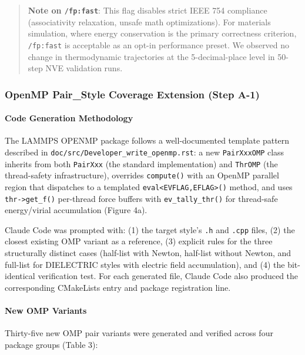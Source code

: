 \documentclass[
  11pt,
]{article}
\begin{document}
\begin{quote}
\textbf{Note on \texttt{/fp:fast}}: This flag disables strict IEEE 754
compliance (associativity relaxation, unsafe math optimizations). For
materials simulation, where energy conservation is the primary
correctness criterion, \texttt{/fp:fast} is acceptable as an opt-in
performance preset. We observed no change in thermodynamic trajectories
at the 5-decimal-place level in 50-step NVE validation runs.
\end{quote}

\subsubsection{OpenMP Pair\_Style Coverage Extension (Step
A-1)}\label{openmp-pair_style-coverage-extension-step-a-1}

\paragraph{Code Generation
Methodology}\label{code-generation-methodology}

The LAMMPS OPENMP package follows a well-documented template pattern
described in \texttt{doc/src/Developer\_write\_openmp.rst}: a new
\texttt{PairXxxOMP} class inherits from both \texttt{PairXxx} (the
standard implementation) and \texttt{ThrOMP} (the thread-safety
infrastructure), overrides \texttt{compute()} with an OpenMP parallel
region that dispatches to a templated
\texttt{eval\textless{}EVFLAG,EFLAG\textgreater{}()} method, and uses
\texttt{thr-\textgreater{}get\_f()} per-thread force buffers with
\texttt{ev\_tally\_thr()} for thread-safe energy/virial accumulation
(Figure 4a).

Claude Code was prompted with: (1) the target style's \texttt{.h} and
\texttt{.cpp} files, (2) the closest existing OMP variant as a
reference, (3) explicit rules for the three structurally distinct cases
(half-list with Newton, half-list without Newton, and full-list for
DIELECTRIC styles with electric field accumulation), and (4) the
bit-identical verification test. For each generated file, Claude Code
also produced the corresponding CMakeLists entry and package
registration line.

\paragraph{New OMP Variants}\label{new-omp-variants}

Thirty-five new OMP pair variants were generated and verified across
four package groups (Table 3):
\end{document}
